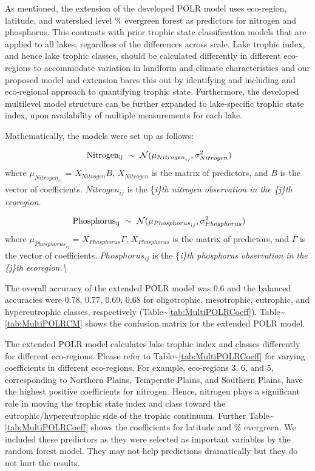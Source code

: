 \documentclass[fleqn,10pt]{wlpeerj} %
\begin{document}
As mentioned, the extension of the developed POLR model uses eco-region, latitude, and watershed level \% evergreen forest as predictors for nitrogen and phosphorus. This contrasts with prior trophic state classification models that are applied to all lakes, regardless of the differences across scale. Lake trophic index, and hence lake trophic classes, should be calculated differently in different eco-regions to accommodate variation in landform and climate characteristics and our proposed model and extension bares this out by identifying and including and eco-regional approach to quantifying trophic state. Furthermore, the developed multilevel model structure can be further expanded to lake-specific trophic state index, upon availability of multiple measurements for each lake.

Mathematically, the models were set up as follows:

\begin{equation}
\mathrm{  \ Nitrogen_{ij}} \ \sim \ \mathcal{N}( \mu_{{Nitrogen}_{ij}},\sigma_{Nitrogen}^2)\\
\end{equation}
where \(\mu_{{Nitrogen}_{ij}}\) = \(X_{Nitrogen}B\), \(X_{Nitrogen}\) is the matrix of predictors, and \(B\) is the vector of coefficients. \(Nitrogen_{ij}\) is the \{\it i\}th nitrogen observation in the \{\it j\}th ecoregion.

\begin{equation}
\mathrm{  \ Phosphorus_{ij}} \ \sim \ \mathcal{N}( \mu_{{Phosphorus}_{ij}},\sigma_{Phosphorus}^2)\\
\end{equation}
where \(\mu_{{Phosphorus}_{ij}}\) = \(X_{Phosphorus}\Gamma\), \(X_{Phosphorus}\) is the matrix of predictors, and \(\Gamma\) is the vector of coefficients. \(Phosphorus_{ij}\) is the \{\it i\}th phosphorus observation in the \{\it j\}th ecoregion.\textbackslash{}

The overall accuracy of the extended POLR model was 0.6 and the balanced accuracies were 0.78, 0.77, 0.69, 0.68 for oligotrophic, mesotrophic, eutrophic, and hypereutrophic classes, respectively (Table\textasciitilde{}\ref{tab:MultiPOLRCoeff}). Table\textasciitilde{}\ref{tab:MultiPOLRCM} shows the confusion matrix for the extended POLR model.

The extended POLR model calculates lake trophic index and classes differently for different eco-regions. Please refer to Table\textasciitilde{}\ref{tab:MultiPOLRCoeff} for varying coefficients in different eco-regions. For example, eco-regions 3, 6, and 5, corresponding to Northern Plains, Temperate Plains, and Southern Plains, have the highest positive coefficients for nitrogen. Hence, nitrogen plays a significant role in moving the trophic state index and class toward the eutrophic/hypereutrophic side of the trophic continuum. Further Table\textasciitilde{}\ref{tab:MultiPOLRCoeff} shows the coefficients for latitude and \% evergreen. We included these predictors as they were selected as important variables by the random forest model. They may not help predictions dramatically but they do not hurt the results.
\end{document}
